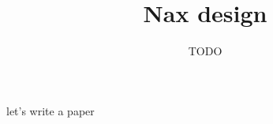 \documentclass{article}
\title{Nax design}
\author{TODO}
\begin{document}
\maketitle
let's write a paper
\end{document}
